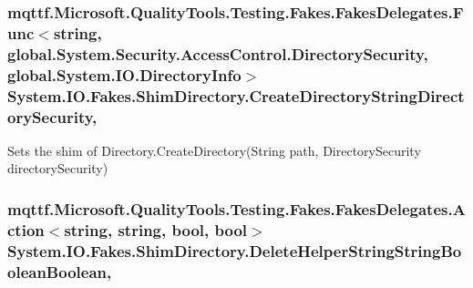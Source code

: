 \hypertarget{class_system_1_1_i_o_1_1_fakes_1_1_shim_directory_aefb8ed4d675b858d14bc8ac03ebcca5d}{
\subsubsection[{Create\-Directory\-String\-Directory\-Security}]{\setlength{\rightskip}{0pt plus 5cm}mqttf.\-Microsoft.\-Quality\-Tools.\-Testing.\-Fakes.\-Fakes\-Delegates.\-Func$<$string, global.\-System.\-Security.\-Access\-Control.\-Directory\-Security, global.\-System.\-I\-O.\-Directory\-Info$>$ System.\-I\-O.\-Fakes.\-Shim\-Directory.\-Create\-Directory\-String\-Directory\-Security\hspace{0.3cm}{\ttfamily [static]}, {\ttfamily [set]}}}\label{class_system_1_1_i_o_1_1_fakes_1_1_shim_directory_aefb8ed4d675b858d14bc8ac03ebcca5d}


Sets the shim of Directory.\-Create\-Directory(\-String path, Directory\-Security directory\-Security)

\hypertarget{class_system_1_1_i_o_1_1_fakes_1_1_shim_directory_a7ae04acc7529cf80544eb048f6634225}{
\subsubsection[{Delete\-Helper\-String\-String\-Boolean\-Boolean}]{\setlength{\rightskip}{0pt plus 5cm}mqttf.\-Microsoft.\-Quality\-Tools.\-Testing.\-Fakes.\-Fakes\-Delegates.\-Action$<$string, string, bool, bool$>$ System.\-I\-O.\-Fakes.\-Shim\-Directory.\-Delete\-Helper\-String\-String\-Boolean\-Boolean\hspace{0.3cm}{\ttfamily [static]}, {\ttfamily [set]}}}\label{class_system_1_1_i_o_1_1_fakes_1_1_shim_directory_a7ae04acc7529cf80544eb048f6634225}


